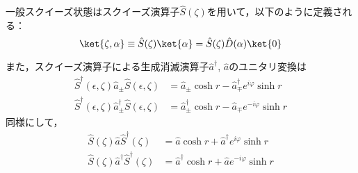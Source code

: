一般スクイーズ状態はスクイーズ演算子$\hat{S}(\zeta)$を用いて，以下のように定義される：
\begin{equation}
    \ket{\zeta,\alpha}\equiv\hat{S}(\zeta)\ket{\alpha}
    =\hat{S}(\zeta)\hat{D}(\alpha)\ket{0}
\end{equation}


また，スクイーズ演算子による生成消滅演算子$\hat{a}^\dagger$, $\hat{a}$のユニタリ変換は
\begin{align}
    \hat{S}^\dagger(\epsilon, \zeta)\hat{a}_{\pm}\hat{S}(\epsilon, \zeta)&=
    \hat{a}_{\pm}\cosh{r} - \hat{a}^\dagger_{\mp} e^{i\varphi}\sinh{r}\\[10pt]
    \hat{S}^\dagger(\epsilon,\zeta)\hat{a}_{\pm}^{\dagger}\hat{S}(\epsilon,\zeta)&=
    \hat{a}_{\pm}^\dagger\cosh{r} - \hat{a}_{\mp} e^{-i\varphi}\sinh{r}
\end{align}
同様にして，
\begin{align}
    \hat{S}(\zeta)\hat{a}\hat{S}^\dagger(\zeta)&=
    \hat{a}\cosh{r} + \hat{a}^\dagger e^{i\varphi}\sinh{r}\\[10pt]
    \hat{S}(\zeta)\hat{a}^{\dagger}\hat{S}^\dagger(\zeta)&=
    \hat{a}^\dagger\cosh{r} + \hat{a} e^{-i\varphi}\sinh{r}
\end{align}

